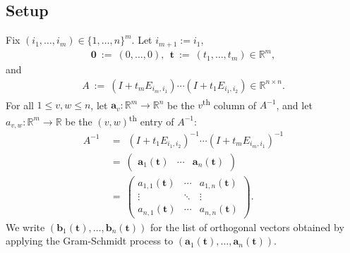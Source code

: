 \documentclass[12pt, reqno, oneside]{amsart}
\numberwithin{equation}{section}
\begin{document}
\subsection{Setup} 
Fix $(i_1, \dots, i_m) \in \{1, \dots, n\}^m$. Let $i_{m+1} := i_1$,
\begin{align}
\mathbf{0} \ := \ (0, \dots, 0), \ \ \mathbf{t} \ := \ (t_1, \dots, t_m) \in \mathbb{R}^m,
\end{align}
and 
\begin{align}
A \ := \ (I+t_mE_{i_m,i_1}) \cdots (I+t_1E_{i_1,i_2}) \in \mathbb{R}^{n \times n}.
\end{align}
For all $1 \leq v, w \leq n$, let $\mathbf{a}_v : \mathbb{R}^m \to \mathbb{R}^n$ be the $v$\textsuperscript{th} column of $A^{-1}$, and let $a_{v,w} : \mathbb{R}^m \to \mathbb{R}$ be the $(v,w)$\textsuperscript{th} entry of $A^{-1}$:
\begin{align}
\nonumber
A^{-1} \ &= \ \ (I+t_1E_{i_1,i_2})^{-1}\cdots(I+t_mE_{i_m,i_1})^{-1} \\
\nonumber
& = \ 
\begin{pmatrix}
\mathbf{a}_1(\mathbf{t}) & \cdots & \mathbf{a}_n(\mathbf{t})
\end{pmatrix} \\
\label{eq:matrixA}
& = \
\begin{pmatrix}
a_{1,1}(\mathbf{t}) & \cdots & a_{1,n}(\mathbf{t}) \\
\vdots & \ddots & \vdots \\
a_{n,1}(\mathbf{t}) & \cdots & a_{n,n}(\mathbf{t})
\end{pmatrix}.
\end{align} 
We write $(\mathbf{b}_1(\mathbf{t}),\dots,\mathbf{b}_n(\mathbf{t}))$ for the list of orthogonal vectors obtained by applying the Gram-Schmidt process to $(\mathbf{a}_1(\mathbf{t}),\dots,\mathbf{a}_n(\mathbf{t}))$.
\end{document}

